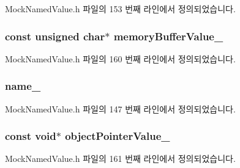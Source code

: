 Mock\+Named\+Value.\+h 파일의 153 번째 라인에서 정의되었습니다.

\subsubsection[{\texorpdfstring{memory\+Buffer\+Value\+\_\+}{memoryBufferValue_}}]{\setlength{\rightskip}{0pt plus 5cm}const unsigned char$\ast$ memory\+Buffer\+Value\+\_\+}\hypertarget{class_mock_named_value_acfb46de823cfde8810c5bae34dd454b2}{}\label{class_mock_named_value_acfb46de823cfde8810c5bae34dd454b2}


Mock\+Named\+Value.\+h 파일의 160 번째 라인에서 정의되었습니다.

\subsubsection[{\texorpdfstring{name\+\_\+}{name_}}]{ name\+\_\+\hspace{0.3cm}{\ttfamily [private]}}\hypertarget{class_mock_named_value_aac73c86e1e892f392d1fc423e25f51a8}{}\label{class_mock_named_value_aac73c86e1e892f392d1fc423e25f51a8}


Mock\+Named\+Value.\+h 파일의 147 번째 라인에서 정의되었습니다.

\subsubsection[{\texorpdfstring{object\+Pointer\+Value\+\_\+}{objectPointerValue_}}]{\setlength{\rightskip}{0pt plus 5cm}const void$\ast$ object\+Pointer\+Value\+\_\+}\hypertarget{class_mock_named_value_a436d0ca15a91547fb0b3a39249a42843}{}\label{class_mock_named_value_a436d0ca15a91547fb0b3a39249a42843}


Mock\+Named\+Value.\+h 파일의 161 번째 라인에서 정의되었습니다.

